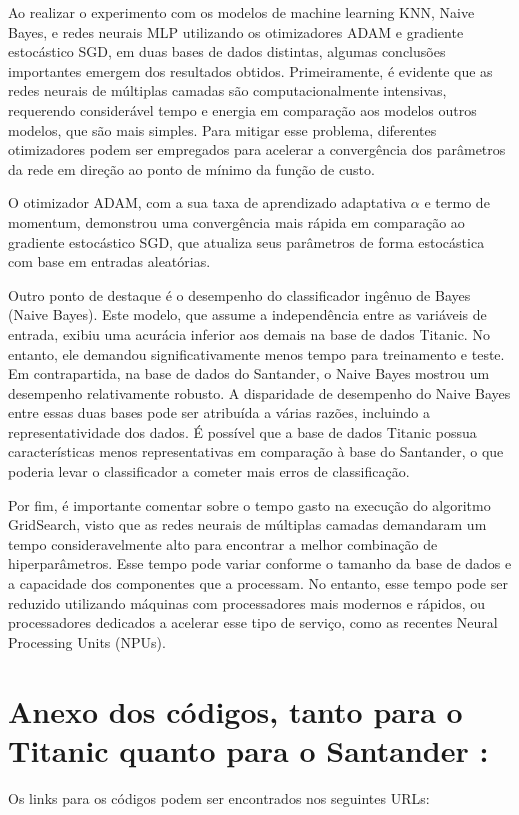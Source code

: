 \documentclass[conference]{IEEEtran}
\begin{document}
Ao realizar o experimento com os modelos de machine learning KNN, Naive Bayes, e redes neurais MLP utilizando os otimizadores ADAM e gradiente estocástico SGD, em duas bases de dados distintas, algumas conclusões importantes emergem dos resultados obtidos. Primeiramente, é evidente que as redes neurais de múltiplas camadas são computacionalmente intensivas, requerendo considerável tempo e energia em comparação aos modelos outros modelos, que são mais simples. Para mitigar esse problema, diferentes otimizadores podem ser empregados para acelerar a convergência dos parâmetros da rede em direção ao ponto de mínimo da função de custo.

O otimizador ADAM, com a sua taxa de aprendizado adaptativa \(\alpha\) e termo de momentum, demonstrou uma convergência mais rápida em comparação ao gradiente estocástico SGD, que atualiza seus parâmetros de forma estocástica com base em entradas aleatórias.

Outro ponto de destaque é o desempenho do classificador ingênuo de Bayes (Naive Bayes). Este modelo, que assume a independência entre as variáveis de entrada, exibiu uma acurácia inferior aos demais na base de dados Titanic. No entanto, ele demandou significativamente menos tempo para treinamento e teste. Em contrapartida, na base de dados do Santander, o Naive Bayes mostrou um desempenho relativamente robusto. A disparidade de desempenho do Naive Bayes entre essas duas bases pode ser atribuída a várias razões, incluindo a representatividade dos dados. É possível que a base de dados Titanic possua características menos representativas em comparação à base do Santander, o que poderia levar o classificador a cometer mais erros de classificação.

Por fim, é importante comentar sobre o tempo gasto na execução do algoritmo GridSearch, visto que as redes neurais de múltiplas camadas demandaram um tempo consideravelmente alto para encontrar a melhor combinação de hiperparâmetros. Esse tempo pode variar conforme o tamanho da base de dados e a capacidade dos componentes que a processam. No entanto, esse tempo pode ser reduzido utilizando máquinas com processadores mais modernos e rápidos, ou processadores dedicados a acelerar esse tipo de serviço, como as recentes Neural Processing Units (NPUs).

\section{Anexo dos códigos, tanto para o Titanic quanto para o Santander : }
Os links para os códigos podem ser encontrados nos seguintes URLs:
\end{document}
